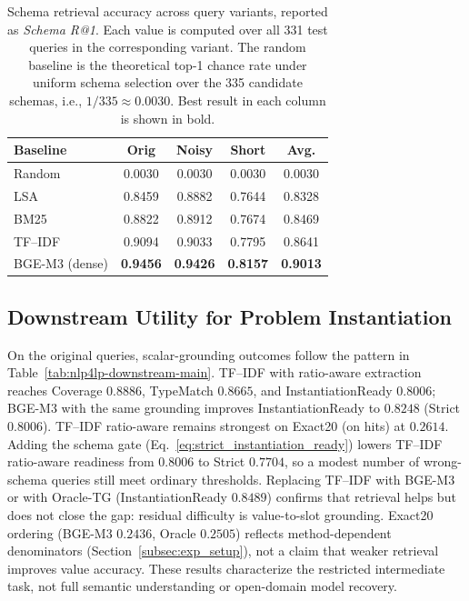 \documentclass[pdflatex,sn-basic,Numbered]{sn-jnl}
\begin{document}
\begin{table}[t]
  \centering
  \caption{Schema retrieval accuracy across query variants, reported as \textit{Schema R@1}. Each value is computed over all 331 test queries in the corresponding variant. The random baseline is the theoretical top-1 chance rate under uniform schema selection over the 335 candidate schemas, i.e., $1/335 \approx 0.0030$. Best result in each column is shown in bold.}
  \label{tab:nlp4lp-retrieval-main}
  \small
  \begin{tabular}{lcccc}
    \toprule
    Baseline & Orig & Noisy & Short & Avg. \\
    \midrule
    Random  & 0.0030 & 0.0030 & 0.0030 & 0.0030 \\
    LSA     & 0.8459 & 0.8882 & 0.7644 & 0.8328 \\
    BM25    & 0.8822 & 0.8912 & 0.7674 & 0.8469 \\
    TF--IDF & 0.9094 & 0.9033 & 0.7795 & 0.8641 \\
    BGE-M3 (dense) & \textbf{0.9456} & \textbf{0.9426} & \textbf{0.8157} & \textbf{0.9013} \\
    \bottomrule
  \end{tabular}
\end{table}

\subsection{Downstream Utility for Problem Instantiation}
\label{subsec:exp_downstream}

On the original queries, scalar-grounding outcomes follow the pattern in Table~\ref{tab:nlp4lp-downstream-main}. TF--IDF with ratio-aware extraction reaches Coverage $0.8886$, TypeMatch $0.8665$, and InstantiationReady $0.8006$; BGE-M3 with the same grounding improves InstantiationReady to $0.8248$ (Strict $0.8006$). TF--IDF ratio-aware remains strongest on Exact20 (on hits) at $0.2614$. Adding the schema gate (Eq.~\eqref{eq:strict_instantiation_ready}) lowers TF--IDF ratio-aware readiness from $0.8006$ to Strict $0.7704$, so a modest number of wrong-schema queries still meet ordinary thresholds. Replacing TF--IDF with BGE-M3 or with Oracle-TG (InstantiationReady $0.8489$) confirms that retrieval helps but does not close the gap: residual difficulty is value-to-slot grounding. Exact20 ordering (BGE-M3 $0.2436$, Oracle $0.2505$) reflects method-dependent denominators (Section~\ref{subsec:exp_setup}), not a claim that weaker retrieval improves value accuracy. These results characterize the restricted intermediate task, not full semantic understanding or open-domain model recovery.
\end{document}
